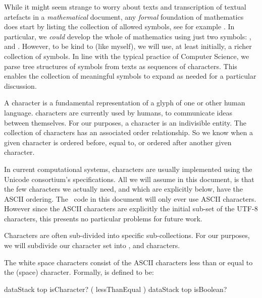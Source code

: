 While it might seem strange to worry about texts and transcription of 
textual artefacts in a \emph{mathematical} document, any \emph{formal} 
foundation of mathematics does start by listing the collection of allowed 
symbols, see for example \cite{kleene2009introMetaMathematics}. In 
particular, we \emph{could} develop the whole of mathematics using just 
two symbols: \quote{(}, and \quote{)}. However, to be kind to  (like myself), we will use, at least initially, a 
richer collection of symbols. In line with the typical practice of 
Computer Science, we parse tree structures of symbols from texts as 
sequences of characters. This enables the collection of meaningful symbols 
to expand as needed for a particular discussion. 

\subChapterAppendix[title=Characters, reference=characterSpec]

A character is a fundamental representation of a glyph of one or other 
human language.  characters are currently used by humans, 
to communicate ideas between themselves. For our purposes, a character is 
an indivisible entity. The collection of characters has an associated 
order relationship. So we know when a given character is ordered before, 
equal to, or ordered after another given character. 

In current computational systems, characters are usually implemented using 
the Unicode consortium's  specifications. All we will assume 
in this document, is that the few characters we actually need, and which 
are explicitly  below, have the  ASCII 
ordering. The \joylol\ code in this document will only ever use ASCII 
characters. However since the ASCII characters are explicitly the initial 
sub-set of the UTF-8 characters, this presents no particular problems for 
future work. 

Characters are often sub-divided into specific  
sub-collections. For our purposes, we will subdivide our character set 
into ,  and  
characters. 

\startDefinition

The white space characters consist of the ASCII characters less than or 
equal to the \quote{~} (space) character. Formally, 
 is defined to be: 

\starttyping
{ dataStack top isCharacter? }
( \space lessThanEqual )
{ dataStack top isBoolean? }
\stoptyping

